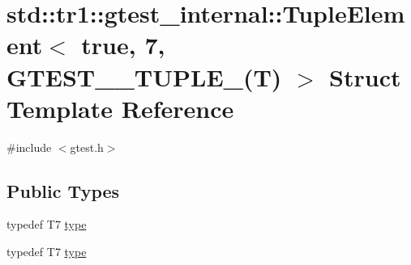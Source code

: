 \hypertarget{structstd_1_1tr1_1_1gtest__internal_1_1_tuple_element_3_01true_00_017_00_01_g_t_e_s_t__10___t_u_p_l_e___07_t_08_01_4}{\section{std\-:\-:tr1\-:\-:gtest\-\_\-internal\-:\-:Tuple\-Element$<$ true, 7, G\-T\-E\-S\-T\-\_\-\_\-\-T\-U\-P\-L\-E\-\_\-(T) $>$ Struct Template Reference}
\label{structstd_1_1tr1_1_1gtest__internal_1_1_tuple_element_3_01true_00_017_00_01_g_t_e_s_t__10___t_u_p_l_e___07_t_08_01_4}
}


{\ttfamily \#include $<$gtest.\-h$>$}

\subsection*{Public Types}
\begin{DoxyCompactItemize}
\item 
typedef T7 \hyperlink{structstd_1_1tr1_1_1gtest__internal_1_1_tuple_element_3_01true_00_017_00_01_g_t_e_s_t__10___t_u_p_l_e___07_t_08_01_4_afc625b9bf1ae4c5c51a968134dc9b30a}{type}
\item 
typedef T7 \hyperlink{structstd_1_1tr1_1_1gtest__internal_1_1_tuple_element_3_01true_00_017_00_01_g_t_e_s_t__10___t_u_p_l_e___07_t_08_01_4_afc625b9bf1ae4c5c51a968134dc9b30a}{type}
\end{DoxyCompactItemize}



